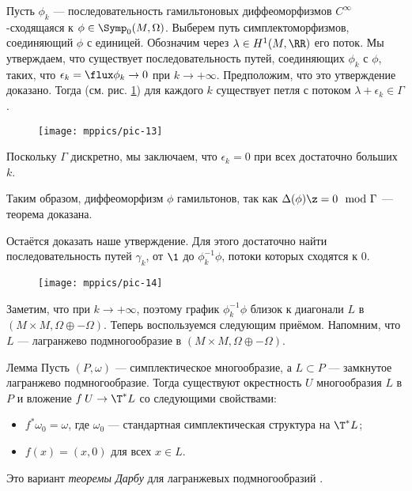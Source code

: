Пусть $\phi_k$ --- последовательность гамильтоновых диффеоморфизмов $C^\infty$-сходящаяся к $\phi\in\Symp_0(M,\Omega)$.
Выберем путь симплектоморфизмов, соединяющий $\phi$ с единицей.
Обозначим через $\lambda \in H^1 (M, \RR)$ его поток.
Мы утверждаем, что существует последовательность путей, соединяющих $\phi_k$ с $\phi$, 
таких, что $\epsilon_k=\flux \phi_k\to 0$ при $k\to +\infty$.
Предположим, что это утверждение доказано.
Тогда (см. рис. \ref{pic-13}) для каждого $k$ существует петля с потоком $\lambda + \epsilon_k\in \Gamma$.
\begin{figure}[ht!]
\centering
\texttt{[image: mppics/pic-13]}
\caption{}\label{pic-13}
\vskip0mm
\end{figure}
Поскольку $\Gamma$ дискретно, мы заключаем, что $\epsilon_k=0$ при всех достаточно больших $k$.



Таким образом, диффеоморфизм $\phi$ гамильтонов, так как $\Delta(\phi) \z= 0 \mod{\Gamma}$  --- теорема доказана.

Остаётся доказать наше утверждение.
Для этого достаточно найти последовательность путей $\gamma_k$, от
$\1$ до $\phi_k^{-1}\phi$, потоки которых сходятся к $0$.

\begin{figure}[ht!]
\centering
\texttt{[image: mppics/pic-14]}
\caption{}\label{pic-14}
\vskip0mm
\end{figure}

Заметим, что  при $k \to
+\infty$, поэтому график
$\phi_k^{-1}\phi$ близок к диагонали $L$ в $(M \times M, \Omega \oplus
-\Omega)$. 
Теперь воспользуемся следующим приёмом.
Напомним, что $L$ --- лагранжево подмногообразие в $(M \times M,
\Omega \oplus -\Omega)$.

\begin{thm}{Лемма}
Пусть $(P, \omega)$ --- симплектическое многообразие, а $L\subset P$
--- замкнутое лагранжево подмногообразие. 
Тогда существуют окрестность $U$ многообразия $L$ в $P$ и вложение
$f\: U \to \T^\ast L$ со следующими свойствами: 
\begin{itemize}
\item $f^\ast\omega_0 = \omega$, где $\omega_0$ --- стандартная симплектическая структура на $\T^\ast L$;
\item $f(x) = (x,0)$ для всех $x\in L$.
\end{itemize}
\end{thm}
Это вариант \emph{теоремы Дарбу} для лагранжевых
подмногообразий \cite{MS}. 

